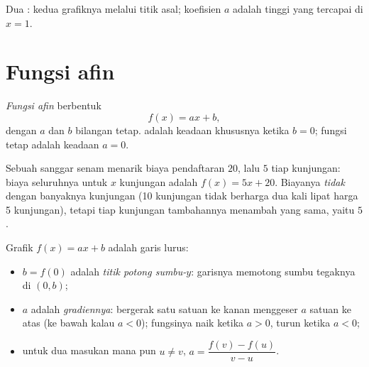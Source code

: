 \begin{omfigure}

{\small Dua : kedua grafiknya melalui titik asal;
koefisien $a$ adalah tinggi yang tercapai di $x = 1$.}
\end{omfigure}

\section{Fungsi afin}

\begin{definition}\label{def:g9:linfunc:affine}
\emph{Fungsi afin} berbentuk
\[
f(x) = a x + b ,
\]
dengan $a$ dan $b$ bilangan tetap.  adalah keadaan
khususnya ketika $b = 0$; fungsi tetap adalah keadaan $a = 0$.
\end{definition}

\begin{example}
Sebuah sanggar senam menarik biaya pendaftaran $20$, lalu $5$ tiap
kunjungan: biaya seluruhnya untuk $x$ kunjungan adalah
$f(x) = 5x + 20$. Biayanya \emph{tidak}  dengan banyaknya
kunjungan (10 kunjungan tidak berharga dua kali lipat harga 5
kunjungan), tetapi tiap kunjungan tambahannya menambah  yang
sama, yaitu $5$.
\end{example}

\begin{proposition}\label{prop:g9:linfunc:affinegraph}
Grafik $f(x) = ax + b$ adalah garis lurus:
\begin{itemize}
  \item $b = f(0)$ adalah \emph{titik potong sumbu-$y$}: garisnya
        memotong sumbu tegaknya di $(0, b)$;
  \item $a$ adalah \emph{gradiennya}: bergerak satu
        satuan ke kanan menggeser $a$ satuan ke atas (ke bawah kalau
        $a < 0$); fungsinya naik ketika $a > 0$, turun ketika $a < 0$;
  \item untuk dua masukan mana pun $u \neq v$,
        $a = \dfrac{f(v) - f(u)}{v - u}$.
\end{itemize}
\end{proposition}

